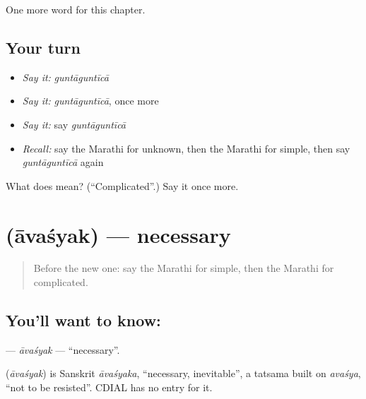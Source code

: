 \begin{grammarlens}[title={What you've built}]
One more word for this chapter.
\end{grammarlens}

\subsection*{Your turn}
\begin{itemize}
\raggedright
  \item \emph{Say it:} \emph{guntāguntīcā}
  \item \emph{Say it:} \emph{guntāguntīcā}, once more
  \item \emph{Say it:} say \emph{guntāguntīcā}
  \item \emph{Recall:} say the Marathi for unknown, then the Marathi for simple, then say \emph{guntāguntīcā} again
\end{itemize}

\begin{tcolorbox}[breakable,colback=teal!4,colframe=teal!35!black,title={Before you move on}]
What does  mean? (\textquotedblleft{}Complicated\textquotedblright{}.) Say it once more.
\end{tcolorbox}
\section[\texorpdfstring{\mr{आवश्यक} (āvaśyak)}{आवश्यक (āvaśyak)}]{ (āvaśyak) — necessary}

\label{lesson:MR-C259-avasyak}



\begin{quote}
Before the new one: say the Marathi for simple, then the Marathi for complicated.
\end{quote}

\subsection*{You'll want to know: }
\textbf{} — \emph{āvaśyak} — \textquotedblleft{}necessary\textquotedblright{}.

\begin{cousinweb}
\textbf{} (\emph{āvaśyak}) is Sanskrit \emph{āvaśyaka}, \textquotedblleft{}necessary, inevitable\textquotedblright{}, a tatsama built on \emph{avaśya}, \textquotedblleft{}not to be resisted\textquotedblright{}. CDIAL has no entry for it.
\end{cousinweb}


